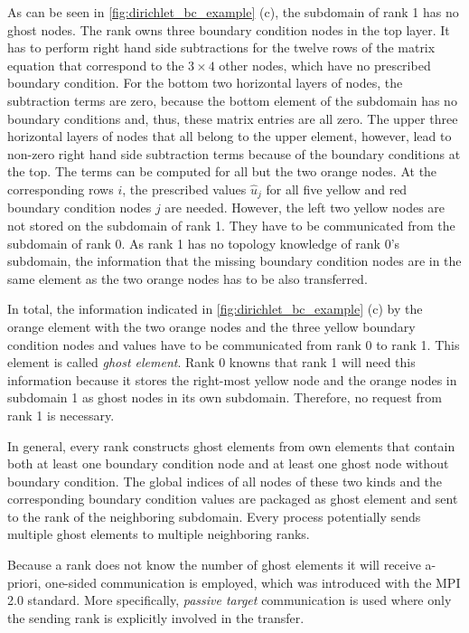 As can be seen in \cref{fig:dirichlet_bc_example} (c), the subdomain of rank 1 has no ghost nodes. The rank owns three boundary condition nodes in the top layer. It has to perform right hand side subtractions for the twelve rows of the matrix equation that correspond to the $3\times 4$ other nodes, which have no prescribed boundary condition. For the bottom two horizontal layers of nodes, the subtraction terms are zero, because the bottom element of the subdomain has no boundary conditions and, thus, these matrix entries are all zero.
The upper three horizontal layers of nodes that all belong to the upper element, however, lead to non-zero right hand side subtraction terms because of the boundary conditions at the top. The terms can be computed for all but the two orange nodes. 
At the corresponding rows $i$, the prescribed values $\hat{u}_j$ for all five yellow and red boundary condition nodes $j$ are needed. However, the left two yellow nodes are not stored on the subdomain of rank 1. They have to be communicated from the subdomain of rank 0. As rank 1 has no topology knowledge of rank 0's subdomain, the information that the missing boundary condition nodes are in the same element as the two orange nodes has to be also transferred. 

In total, the information indicated in \cref{fig:dirichlet_bc_example} (c) by the orange element with the two orange nodes and the three yellow boundary condition nodes and values have to be communicated from rank 0 to rank 1. This element is called \emph{ghost element}.
Rank 0 knowns that rank 1 will need this information because it stores the right-most yellow node and the orange nodes in subdomain 1 as ghost nodes in its own subdomain. Therefore, no request from rank 1 is necessary.

In general, every rank constructs ghost elements from own elements that contain both at least one boundary condition node and at least one ghost node without boundary condition. The global indices of all nodes of these two kinds and the corresponding boundary condition values are packaged as ghost element and sent to the rank of the neighboring subdomain. Every process potentially sends multiple ghost elements to multiple neighboring ranks. 

Because a rank does not know the number of ghost elements it will receive a-priori, one-sided communication is employed, which was introduced with the MPI 2.0 standard. More specifically, \emph{passive target} communication is used where only the sending rank is explicitly involved in the transfer.

